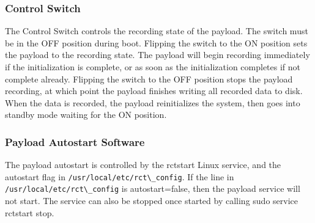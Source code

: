 \documentclass{report}
\begin{document}
				\subsubsection{Control Switch}
					The Control Switch controls the recording state of the payload.  The switch must be in the OFF position during boot.  Flipping the switch to the ON position sets the payload to the recording state.  The payload will begin recording immediately if the initialization is complete, or as soon as the initialization completes if not complete already.  Flipping the switch to the OFF position stops the payload recording, at which point the payload finishes writing all recorded data to disk.  When the data is recorded, the payload reinitializes the system, then goes into standby mode waiting for the ON position.
				\subsubsection{Payload Autostart Software}
					The payload autostart is controlled by the rctstart Linux service, and the autostart flag in \lstinline{/usr/local/etc/rct\_config}.  If the line in \lstinline{/usr/local/etc/rct\_config} is autostart=false, then the payload service will not start.  The service can also be stopped once started by calling sudo service rctstart stop.
	\appendix
	\printglossaries
\end{document}
